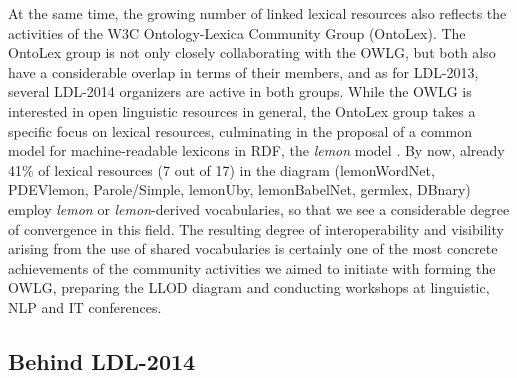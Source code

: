 At the same time, the growing number of linked lexical resources also reflects the activities of the W3C Ontology-Lexica Community Group (OntoLex). The OntoLex group is not only closely collaborating with the OWLG, but both also have a considerable overlap in terms of their members, and as for LDL-2013, several LDL-2014 organizers are active in both groups.
While the OWLG is interested in open linguistic resources in general, the OntoLex group takes a specific focus on lexical resources, culminating in the proposal of a common model for machine-readable lexicons in RDF, the \emph{lemon} model \cite{mccrae2012integrating}. 
By now, already 41\% of lexical resources (7 out of 17) in the diagram (lemonWordNet, PDEVlemon, Parole/Simple, lemonUby, lemonBabelNet, germlex, DBnary) employ \emph{lemon} or \emph{lemon}-derived vocabularies, so that we see a considerable degree of convergence in this field. 
The resulting degree of interoperability and visibility arising from the use of shared vocabularies is certainly one of the most concrete achievements of the community activities we aimed to initiate with forming the OWLG, preparing the LLOD diagram and conducting workshops at linguistic, NLP and IT conferences.

\subsection{Behind LDL-2014}





